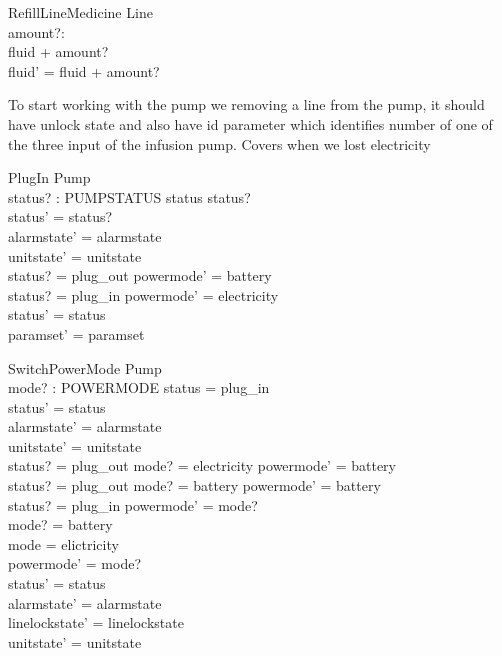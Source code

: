 \documentclass{article}
\begin{document}
	
	\begin{schema}{RefillLineMedicine}
		\Delta Line \\
		amount?: \nat \\
	\where
	    fluid + amount?  \\
	    fluid' = fluid + amount?	
	\end{schema}
	
	To start working with the pump we removing a line from the pump, it should have unlock state
	and also have id parameter which identifies number of one of the
	three input of the infusion pump.	
	Covers when we lost electricity
	\begin{schema}{PlugIn}
		\Delta Pump\\
		status? : PUMPSTATUS
	\where
		status \neq status? \\
		status' = status? \\
		alarmstate' = alarmstate \\
		unitstate' = unitstate \\
		status? = plug\_out \implies powermode' = battery \\
		status? = plug\_in \implies powermode' = electricity \\
		status' = status \\
		paramset' = paramset		
	\end{schema}
	
	\begin{schema}{SwitchPowerMode}
		\Delta Pump \\
		mode? : POWERMODE
	\where 
		status = plug\_in \\
		status' = status \\
		alarmstate' = alarmstate \\
		unitstate' = unitstate \\
		status? = plug\_out \land mode? = electricity \implies powermode' = battery \\
		status? = plug\_out \land mode? = battery \implies powermode' = battery \\
		
		status? = plug\_in \implies powermode' = mode? \\
		mode? = battery \\
		mode = elictricity \\
		
		powermode' = mode? \\
		status' = status \\
		alarmstate' = alarmstate \\
		linelockstate' = linelockstate \\
		unitstate' = unitstate \\
	\end{schema}
	
\end{document}
